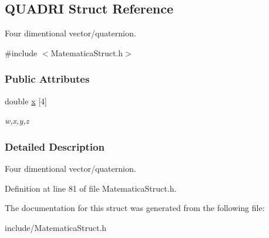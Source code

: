 \hypertarget{structQUADRI}{}\subsection{Q\+U\+A\+D\+RI Struct Reference}
\label{structQUADRI}


Four dimentional vector/quaternion.  




{\ttfamily \#include $<$Matematica\+Struct.\+h$>$}

\subsubsection*{Public Attributes}
\begin{DoxyCompactItemize}
\item 
double \hyperlink{structQUADRI_ad1f678f640ba00a561dbd8dc314a8c5d}{x} \mbox{[}4\mbox{]}\hypertarget{structQUADRI_ad1f678f640ba00a561dbd8dc314a8c5d}{}\label{structQUADRI_ad1f678f640ba00a561dbd8dc314a8c5d}

\begin{DoxyCompactList}\small\item\em w,x,y,z \end{DoxyCompactList}\end{DoxyCompactItemize}


\subsubsection{Detailed Description}
Four dimentional vector/quaternion. 

Definition at line 81 of file Matematica\+Struct.\+h.



The documentation for this struct was generated from the following file\+:\begin{DoxyCompactItemize}
\item 
include/Matematica\+Struct.\+h\end{DoxyCompactItemize}
